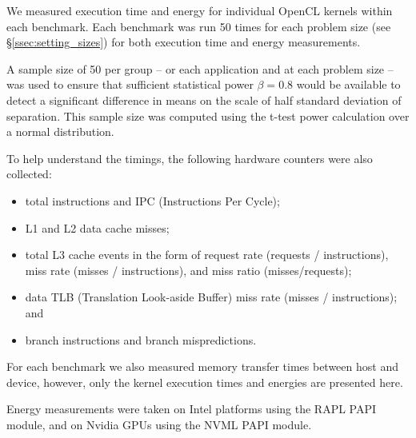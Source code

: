 \documentclass[../document.tex]{subfiles}
\begin{document}
\label{ssec:measurements}


We measured execution time and energy for individual OpenCL kernels within each benchmark.
Each benchmark was run 50 times for each problem size (see \S\ref{ssec:setting_sizes}) for both execution time and energy measurements.

A sample size of 50 per group -- or each application and at each problem size -- was used to ensure that sufficient statistical power $\beta = 0.8$ would be available to detect a significant difference in means on the scale of half standard deviation of separation.
This sample size was computed using the t-test power calculation over a normal distribution.

To help understand the timings, the following hardware counters were also collected:
\begin{itemize}
	\item total instructions and IPC (Instructions Per Cycle);
	\item L1 and L2 data cache misses;
	\item total L3 cache events in the form of request rate (requests / instructions), miss rate (misses / instructions), and miss ratio (misses/requests);
	\item data TLB (Translation Look-aside Buffer) miss rate (misses / instructions); and
	\item branch instructions and branch mispredictions.
\end{itemize}
For each benchmark we also measured memory transfer times between host and device, however, only the kernel execution times and energies are presented here.

Energy measurements were taken on Intel platforms using the RAPL PAPI module, and on Nvidia GPUs using the NVML PAPI module.
\end{document}
